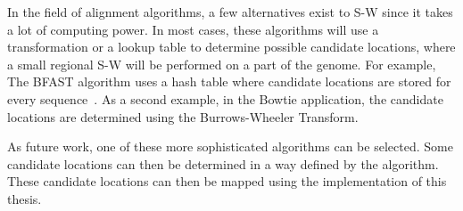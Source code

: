 In the field of alignment algorithms, a few alternatives exist to S-W since it takes a lot of computing power. In most cases, these algorithms will use a transformation or a lookup table to determine possible candidate locations, where a small regional S-W will be performed on a part of the genome. For example, The BFAST algorithm uses a hash table where candidate locations are stored for every sequence~\cite{fpgaImpl}. As a second example, in the Bowtie application, the candidate locations are determined using the Burrows-Wheeler Transform.

As future work, one of these more sophisticated algorithms can be selected. Some candidate locations can then be determined in a way defined by the algorithm. These candidate locations can then be mapped using the implementation of this thesis.